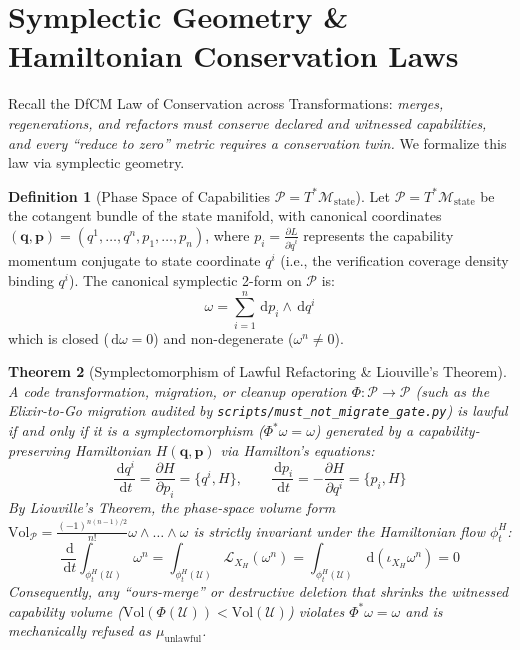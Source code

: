 \documentclass[10pt,twoside,openany]{book}
\theoremstyle{plain}
\newtheorem{theorem}{Theorem}[chapter]
\theoremstyle{definition}
\newtheorem{definition}[theorem]{Definition}
\theoremstyle{remark}
\newcommand{\Man}{\mathcal{M}}
\newcommand{\dd}{\,\mathrm{d}}
\begin{document}
\section{Symplectic Geometry \& Hamiltonian Conservation Laws}
Recall the DfCM Law of Conservation across Transformations: \emph{merges, regenerations, and refactors must conserve declared and witnessed capabilities, and every ``reduce to zero'' metric requires a conservation twin.} We formalize this law via symplectic geometry.

\begin{definition}[Phase Space of Capabilities $\mathcal{P} = T^*\Man_{\mathrm{state}}$]
Let $\mathcal{P} = T^*\Man_{\mathrm{state}}$ be the cotangent bundle of the state manifold, with canonical coordinates $(\mathbf{q}, \mathbf{p}) = (q^1, \dots, q^n, p_1, \dots, p_n)$, where $p_i = \frac{\partial L}{\partial \dot{q}^i}$ represents the capability momentum conjugate to state coordinate $q^i$ (i.e., the verification coverage density binding $q^i$). The canonical symplectic 2-form on $\mathcal{P}$ is:
\begin{equation}
\omega = \sum_{i=1}^n \dd p_i \wedge \dd q^i
\end{equation}
which is closed ($\dd\omega = 0$) and non-degenerate ($\omega^n \neq 0$).
\end{definition}

\begin{theorem}[Symplectomorphism of Lawful Refactoring \& Liouville's Theorem]
A code transformation, migration, or cleanup operation $\Phi: \mathcal{P} \to \mathcal{P}$ (such as the Elixir-to-Go migration audited by \texttt{scripts/must\_not\_migrate\_gate.py}) is lawful if and only if it is a symplectomorphism ($\Phi^*\omega = \omega$) generated by a capability-preserving Hamiltonian $H(\mathbf{q}, \mathbf{p})$ via Hamilton's equations:
\begin{equation}
\frac{\dd q^i}{\dd t} = \frac{\partial H}{\partial p_i} = \{q^i, H\}, \qquad \frac{\dd p_i}{\dd t} = -\frac{\partial H}{\partial q^i} = \{p_i, H\}
\end{equation}
By Liouville's Theorem, the phase-space volume form $\mathrm{Vol}_{\mathcal{P}} = \frac{(-1)^{n(n-1)/2}}{n!} \omega \wedge \dots \wedge \omega$ is strictly invariant under the Hamiltonian flow $\phi_t^H$:
\begin{equation}
\frac{\dd}{\dd t} \int_{\phi_t^H(\mathcal{U})} \omega^n = \int_{\phi_t^H(\mathcal{U})} \mathcal{L}_{X_H}(\omega^n) = \int_{\phi_t^H(\mathcal{U})} \dd(\iota_{X_H}\omega^n) = 0
\end{equation}
Consequently, any ``ours-merge'' or destructive deletion that shrinks the witnessed capability volume ($\mathrm{Vol}(\Phi(\mathcal{U})) < \mathrm{Vol}(\mathcal{U})$) violates $\Phi^*\omega = \omega$ and is mechanically refused as $\mu_{\mathrm{unlawful}}$.
\end{theorem}
\end{document}
